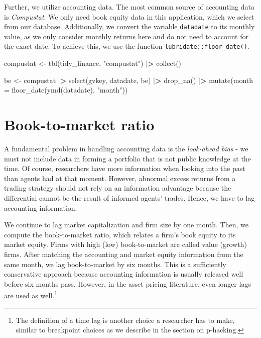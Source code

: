 \documentclass[
]{book}
\newenvironment{Shaded}{\begin{snugshade}}{\end{snugshade}}
\newcommand{\AttributeTok}[1]{\textcolor[rgb]{0.61,0.61,0.61}{#1}}
\newcommand{\ErrorTok}[1]{\textcolor[rgb]{0.14,0.14,0.14}{\textbf{#1}}}
\newcommand{\FunctionTok}[1]{\textcolor[rgb]{0,0,0}{#1}}
\newcommand{\NormalTok}[1]{#1}
\newcommand{\OtherTok}[1]{\textcolor[rgb]{0.37,0.37,0.37}{#1}}
\newcommand{\SpecialCharTok}[1]{\textcolor[rgb]{0,0,0}{#1}}
\newcommand{\StringTok}[1]{\textcolor[rgb]{0.5,0.5,0.5}{#1}}
\begin{document}
Further, we utilize accounting data. The most common source of accounting data is \emph{Compustat}. We only need book equity data in this application, which we select from our database. Additionally, we convert the variable \texttt{datadate} to its monthly value, as we only consider monthly returns here and do not need to account for the exact date. To achieve this, we use the function \texttt{lubridate::floor\_date()}.

\begin{Shaded}
\begin{Highlighting}[]
\NormalTok{compustat }\OtherTok{\textless{}{-}} \FunctionTok{tbl}\NormalTok{(tidy\_finance, }\StringTok{"compustat"}\NormalTok{) }\SpecialCharTok{|}\ErrorTok{\textgreater{}}
  \FunctionTok{collect}\NormalTok{()}

\NormalTok{be }\OtherTok{\textless{}{-}}\NormalTok{ compustat }\SpecialCharTok{|}\ErrorTok{\textgreater{}}
  \FunctionTok{select}\NormalTok{(gvkey, datadate, be) }\SpecialCharTok{|}\ErrorTok{\textgreater{}}
  \FunctionTok{drop\_na}\NormalTok{() }\SpecialCharTok{|}\ErrorTok{\textgreater{}}
  \FunctionTok{mutate}\NormalTok{(}\AttributeTok{month =} \FunctionTok{floor\_date}\NormalTok{(}\FunctionTok{ymd}\NormalTok{(datadate), }\StringTok{"month"}\NormalTok{))}
\end{Highlighting}
\end{Shaded}

\hypertarget{book-to-market-ratio}{%
\section{Book-to-market ratio}\label{book-to-market-ratio}}

A fundamental problem in handling accounting data is the \emph{look-ahead bias} - we must not include data in forming a portfolio that is not public knowledge at the time. Of course, researchers have more information when looking into the past than agents had at that moment. However, abnormal excess returns from a trading strategy should not rely on an information advantage because the differential cannot be the result of informed agents' trades. Hence, we have to lag accounting information.

We continue to lag market capitalization and firm size by one month. Then, we compute the book-to-market ratio, which relates a firm's book equity to its market equity. Firms with high (low) book-to-market are called value (growth) firms. After matching the accounting and market equity information from the same month, we lag book-to-market by six months. This is a sufficiently conservative approach because accounting information is usually released well before six months pass. However, in the asset pricing literature, even longer lags are used as well.\footnote{The definition of a time lag is another choice a researcher has to make, similar to breakpoint choices as we describe in the section on p-hacking.}
\end{document}
